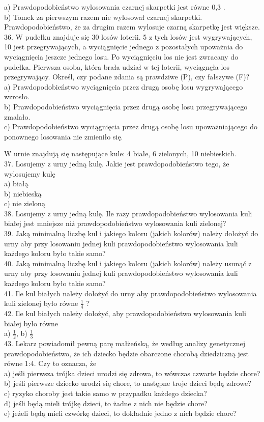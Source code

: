\documentclass[10pt]{article}
\begin{document}
a) Prawdopodobieństwo wylosowania czarnej skarpetki jest równe 0,3 .\\
b) Tomek za pierwszym razem nie wylosował czarnej skarpetki. Prawdopodobieństwo, że za drugim razem wylosuje czarną skarpetkę jest większe.\\
36. W pudełku znajduje się 30 losów loterii. 5 z tych losów jest wygrywających, 10 jest przegrywających, a wyciągnięcie jednego z pozostałych upoważnia do wyciągnięcia jeszcze jednego losu. Po wyciągnięciu los nie jest zwracany do pudełka. Pierwsza osoba, która brała udział w tej loterii, wyciągnęła los przegrywający. Określ, czy podane zdania są prawdziwe (P), czy fałszywe (F)?\\
a) Prawdopodobieństwo wyciągnięcia przez drugą osobę losu wygrywającego wzrosło.\\
b) Prawdopodobieństwo wyciągnięcia przez drugą osobę losu przegrywającego zmalało.\\
c) Prawdopodobieństwo wyciągnięcia przez drugą osobę losu upoważniającego do ponownego losowania nie zmieniło się.

W urnie znajdują się następujące kule: 4 białe, 6 zielonych, 10 niebieskich.\\
37. Losujemy z urny jedną kulę. Jakie jest prawdopodobieństwo tego, że wylosujemy kulę\\
a) białą\\
b) niebieską\\
c) nie zieloną\\
38. Losujemy z urny jedną kulę. Ile razy prawdopodobieństwo wylosowania kuli białej jest mniejsze niż prawdopodobieństwo wylosowania kuli zielonej?\\
39. Jaką minimalną liczbę kul i jakiego koloru (jakich kolorów) należy dołożyć do urny aby przy losowaniu jednej kuli prawdopodobieństwo wylosowania kuli każdego koloru było takie samo?\\
40. Jaką minimalną liczbę kul i jakiego koloru (jakich kolorów) należy usunąć z urny aby przy losowaniu jednej kuli prawdopodobieństwo wylosowania kuli każdego koloru było takie samo?\\
41. Ile kul białych należy dołożyć do urny aby prawdopodobieństwo wylosowania kuli zielonej było równe \(\frac{1}{4}\) ?\\
42. Ile kul białych należy dołożyć, aby prawdopodobieństwo wylosowania kuli białej było równe\\
a) \(\frac{1}{2}\), b) \(\frac{1}{3}\)\\
43. Lekarz powiadomił pewną parę małżeńską, że według analizy genetycznej prawdopodobieństwo, że ich dziecko będzie obarczone chorobą dziedziczną jest równe 1:4. Czy to oznacza, że\\
a) jeśli pierwsza trójka dzieci urodzi się zdrowa, to wówczas czwarte będzie chore?\\
b) jeśli pierwsze dziecko urodzi się chore, to następne troje dzieci będą zdrowe?\\
c) ryzyko choroby jest takie samo w przypadku każdego dziecka?\\
d) jeśli będą mieli trójkę dzieci, to żadne z nich nie będzie chore?\\
e) jeżeli będą mieli czwórkę dzieci, to dokładnie jedno z nich będzie chore?
\end{document}
